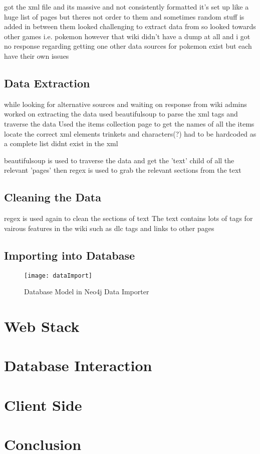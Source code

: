 got the xml file and its massive and not consistently formatted
it's set up like a huge list of pages but theres not order to them and sometimes random stuff is added in between them
looked challenging to extract data from so looked towards other games i.e. pokemon
however that wiki didn't have a dump at all and i got no response regarding getting one
other data sources for pokemon exist but each have their own issues
\subsection{Data Extraction}
while looking for alternative sources and waiting on response from wiki admins worked on extracting the data
used beautifulsoup to parse the xml tags and traverse the data
Used the items collection page to get the names of all the items locate the correct xml elements
trinkets and characters(?) had to be hardcoded as a complete list didnt exist in the xml

beautifulsoup is used to traverse the data and get the 'text' child of all the relevant 'pages'
then regex is used to grab the relevant sections from the text
\subsection{Cleaning the Data}
regex is used again to clean the sections of text
The text contains lots of tags for vairous features in the wiki such as dlc tags and links to other pages

\subsection{Importing into Database}
\begin{figure}[H]
    \centering
    \texttt{[image: dataImport]}
    \caption{Database Model in Neo4j Data Importer}
\end{figure}
\section{Web Stack}
\section{Database Interaction}
\section{Client Side}
\section{Conclusion}